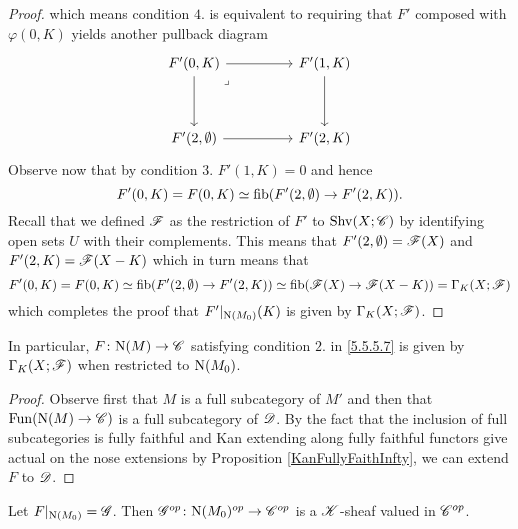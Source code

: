 \documentclass[../../thesis.tex]{subfiles}
\begin{document}
\begin{proof}
    which means condition $4.$ is equivalent to requiring that $F'$ composed with $\varphi(0,K)$ yields another pullback diagram
    \[\begin{tikzcd}
            {F'(0,K)} && {F'(1,K)} \\
            \\
            {F'(2,\emptyset)} && {F'(2,K)}
            \arrow[from=1-1, to=1-3]
            \arrow[from=1-3, to=3-3]
            \arrow[from=3-1, to=3-3]
            \arrow[from=1-1, to=3-1]
            \arrow["\lrcorner"{anchor=center, pos=0.125}, draw=none, from=1-1, to=3-3]
        \end{tikzcd}\]
    Observe now that by condition $3.$ $F'(1,K)=0$ and hence
    \[
        F'(0,K)=F(0,K)\simeq \operatorname{fib}(F'(2,\emptyset) \to F'(2,K)).
    \]
    Recall that we defined $\mathscr{F}$ as the restriction of $F'$ to $\mathrm{Shv}(X;\mathscr{C})$ by identifying open sets $U$ with their complements.
    This means that $F'(2,\emptyset) = \mathscr{F}(X)$ and $F'(2,K) = \mathscr{F}(X-K)$ which in turn means that
    \[
        F'(0,K)=F(0,K)\simeq \operatorname{fib}(F'(2,\emptyset) \to F'(2,K)) \simeq \operatorname{fib}(\mathscr{F}(X) \to \mathscr{F}(X-K)) = \Gamma_K(X;\mathscr{F})
    \]
    which completes the proof that $F'|_{\mathrm{N}(M_0)}(K)$ is given by $\Gamma_K(X;\mathscr{F})$.
\end{proof}
\begin{corollary}
    In particular, $F\colon\mathrm{N}(M) \to \mathscr{C}$ satisfying condition $2.$ in \ref{5.5.5.7} is given by $\Gamma_K(X;\mathscr{F})$ when restricted to $\mathrm{N}(M_0)$.
\end{corollary}
\begin{proof}
    Observe first that $M$ is a full subcategory of $M'$ and then that $\mathrm{Fun}(\mathrm{N}(M) \to \mathscr{C})$ is a full subcategory of $\mathscr{D}$.
    By the fact that the inclusion of full subcategories is fully faithful and Kan extending along fully faithful functors give actual on the nose extensions by Proposition \ref{KanFullyFaithInfty}, we can extend $F$ to $\mathscr{D}$.
\end{proof}
\begin{lemma}
    Let $F|_{\mathrm{N}(M_0)} = \mathscr{G}$.
    Then $\mathscr{G}^{op}\colon \mathrm{N}(M_0)^{op} \to \mathscr{C}^{op}$ is a $\mathscr{K}$-sheaf valued in $\mathscr{C}^{op}$.
\end{lemma}
\end{document}
